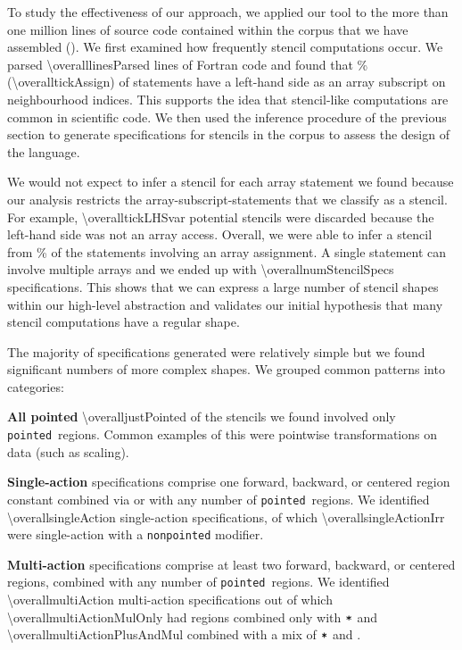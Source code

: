 
\newcommand\regname[1]{\texttt{#1}}
\newcommand\pointed{\regname{pointed}}
\newcommand\forward{\regname{forward}}

To study the effectiveness of our approach, we applied our tool to the
more than one million lines of source code contained within the corpus
that we have assembled (). We first examined how
frequently stencil computations occur. We parsed
\num{\overalllinesParsed} lines of Fortran code and found that
\overalltickAssignPercent\% (\num{\overalltickAssign}) of statements
have a left-hand side as an array subscript on neighbourhood
indices. This supports the idea that stencil-like computations are
common in scientific code.  We then used the inference procedure of
the previous section to generate specifications for stencils in the
corpus to assess the design of the language.

We would not expect to infer a stencil for each array statement we
found because our analysis restricts the array-subscript-statements
that we classify as a stencil. For example, \num{\overalltickLHSvar}
potential stencils were discarded because the left-hand side was not
an array access. Overall, we were able to infer a stencil from
\overalltickAssignSuccessPercentOfTickAssign\% of the statements
involving an array assignment. A single statement can involve multiple
arrays and we ended up with \num{\overallnumStencilSpecs}
specifications. This shows that we can express a large number of
stencil shapes within our high-level abstraction and validates our
initial hypothesis that many stencil computations have a regular
shape.

The majority of specifications generated were relatively simple but we
found significant numbers of more complex shapes. We grouped common
patterns into categories:

\textbf{All pointed} \num{\overalljustPointed} of the stencils we
found involved only \pointed\ regions.
Common examples of this were pointwise transformations on data (such
as scaling).

\textbf{Single-action} specifications comprise one
forward, backward, or centered region constant combined via \term{+}
or \term{*} with any number of \pointed\ regions. We identified \num{\overallsingleAction} single-action
specifications, of which \num{\overallsingleActionIrr} were single-action with a
\texttt{nonpointed} modifier.

\textbf{Multi-action} specifications comprise at least two
 forward, backward, or centered regions, combined with
any number of \pointed\ regions. We identified \num{\overallmultiAction} multi-action
specifications out of which \num{\overallmultiActionMulOnly} had regions combined only with
$\texttt{*}$ and \num{\overallmultiActionPlusAndMul} combined with a mix of $\texttt{*}$ and \term{+}.


